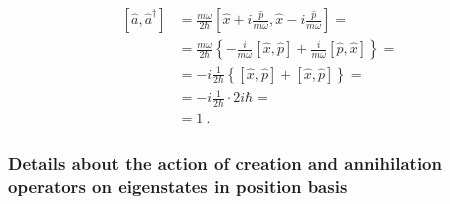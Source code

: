 \documentclass[letterpaper,10pt,english]{jupyterBook}
\begin{document}
\begin{equation*}
\begin{split}\begin{aligned}
  \left[ \hat{a}, \hat{a}^\dagger \right]
  & = \frac{m\omega}{2\hbar} \left[ \hat{x} + i \frac{\hat{p}}{m\omega}, \hat{x} - i \frac{\hat{p}}{m\omega}\right] = \\
  & = \frac{m\omega}{2\hbar} \left\{ -\frac{i}{m\omega} [ \hat{x}, \hat{p} ] + \frac{i}{m\omega} [ \hat{p}, \hat{x} ] \right\} = \\
  & = - i \frac{1}{2\hbar} \left\{ [ \hat{x}, \hat{p} ] + [ \hat{x}, \hat{p} ] \right\} = \\
  & = - i \frac{1}{2\hbar} \cdot 2 i \hbar = \\
  & = 1 \ .
\end{aligned}\end{split}
\end{equation*}\subsubsection*{Details about the action of creation and annihilation operators on eigenstates in position basis}
\end{document}
